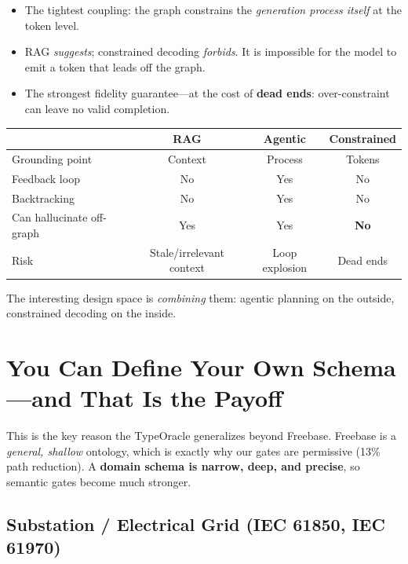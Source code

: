\documentclass[11pt,a4paper]{article}
\begin{document}
\begin{itemize}
  \item The tightest coupling: the graph constrains the
    \emph{generation process itself} at the token level.
  \item RAG \emph{suggests}; constrained decoding \emph{forbids}.
    It is impossible for the model to emit a token that leads off the
    graph.
  \item The strongest fidelity guarantee---at the cost of
    \textbf{dead ends}: over-constraint can leave no valid completion.
\end{itemize}

\begin{center}
\begin{tabular}{@{}lccc@{}}
\toprule
  & RAG & Agentic & Constrained \\
\midrule
  Grounding point & Context & Process & Tokens \\
  Feedback loop    & No      & Yes      & No \\
  Backtracking     & No      & Yes      & No \\
  Can hallucinate off-graph & Yes & Yes & \textbf{No} \\
  Risk             & Stale/irrelevant context & Loop explosion & Dead ends \\
\bottomrule
\end{tabular}
\end{center}

The interesting design space is \emph{combining} them: agentic planning
on the outside, constrained decoding on the inside.

\section{You Can Define Your Own Schema---and That Is the Payoff}

This is the key reason the TypeOracle generalizes beyond Freebase.
Freebase is a \emph{general, shallow} ontology, which is exactly why
our gates are permissive (13\% path reduction).  A \textbf{domain
schema is narrow, deep, and precise}, so semantic gates become much
stronger.

\subsection{Substation / Electrical Grid (IEC 61850, IEC 61970)}
\end{document}
